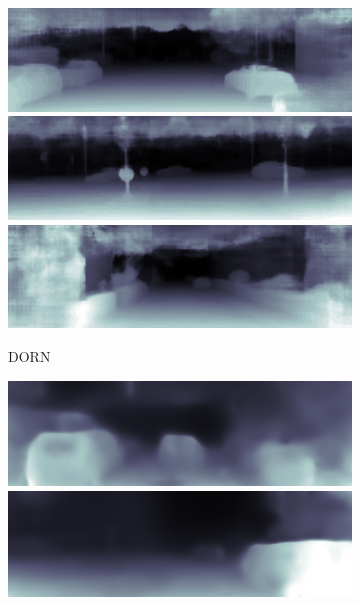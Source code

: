 \begin{figure}[htb]
\begin{subfigure}{0.15\linewidth}
\begin{minipage}[b]{1\linewidth}
  \includegraphics[width=1\linewidth]{figure/dorn/2011_09_26_drive_0009_sync_0000000340.png}\vspace{4pt}
  \includegraphics[width=1\linewidth]{figure/dorn/2011_09_26_drive_0009_sync_0000000388.png}\vspace{4pt}
  \includegraphics[width=1\linewidth]{figure/dorn/2011_09_30_drive_0018_sync_0000000642.png}
  \end{minipage}
  \caption{DORN~\cite{FuCVPR18-DORN}}
  \end{subfigure}
  \begin{subfigure}{0.15\linewidth}
  \begin{minipage}[b]{1\linewidth}
  \includegraphics[width=1\linewidth]{figure/kitti_sfm/2011_09_26_drive_0052_sync_0000000000.png}\vspace{3.5pt}
  \includegraphics[width=1\linewidth]{figure/kitti_sfm/2011_09_26_drive_0013_sync_0000000035.png}\vspace{3.5pt}

\end{minipage}
\end{subfigure}
\end{figure}
